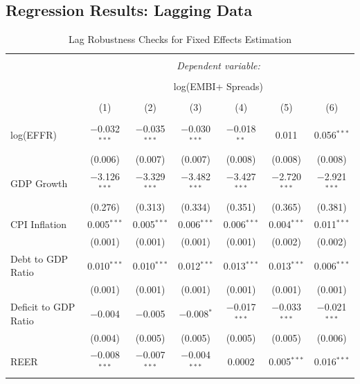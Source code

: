 \documentclass[12pt]{article}
\begin{document}
\subsection{Regression Results: Lagging Data}
\FloatBarrier
\begin{table}[!h] \centering 
  \caption{Lag Robustness Checks for Fixed Effects Estimation} 
  \label{tbl9} 
\scriptsize 
\begin{tabular}{@{\extracolsep{5pt}}lcccccc} 
\\[-1.8ex]\hline 
\hline \\[-1.8ex] 
 & \multicolumn{6}{c}{\textit{Dependent variable:}} \\ 
\cline{2-7} 
\\[-1.8ex] & \multicolumn{6}{c}{log(EMBI+ Spreads)} \\ 
\\[-1.8ex] & (1) & (2) & (3) & (4) & (5) & (6)\\ 
\hline \\[-1.8ex] 
 log(EFFR) & $-$0.032$^{***}$ & $-$0.035$^{***}$ & $-$0.030$^{***}$ & $-$0.018$^{**}$ & 0.011 & 0.056$^{***}$ \\ 
  & (0.006) & (0.007) & (0.007) & (0.008) & (0.008) & (0.008) \\ 
  GDP Growth & $-$3.126$^{***}$ & $-$3.329$^{***}$ & $-$3.482$^{***}$ & $-$3.427$^{***}$ & $-$2.720$^{***}$ & $-$2.921$^{***}$ \\ 
  & (0.276) & (0.313) & (0.334) & (0.351) & (0.365) & (0.381) \\ 
  CPI Inflation & 0.005$^{***}$ & 0.005$^{***}$ & 0.006$^{***}$ & 0.006$^{***}$ & 0.004$^{***}$ & 0.011$^{***}$ \\ 
  & (0.001) & (0.001) & (0.001) & (0.001) & (0.002) & (0.002) \\ 
  Debt to GDP Ratio & 0.010$^{***}$ & 0.010$^{***}$ & 0.012$^{***}$ & 0.013$^{***}$ & 0.013$^{***}$ & 0.006$^{***}$ \\ 
  & (0.001) & (0.001) & (0.001) & (0.001) & (0.001) & (0.001) \\ 
  Deficit to GDP Ratio & $-$0.004 & $-$0.005 & $-$0.008$^{*}$ & $-$0.017$^{***}$ & $-$0.033$^{***}$ & $-$0.021$^{***}$ \\ 
  & (0.004) & (0.005) & (0.005) & (0.005) & (0.005) & (0.006) \\ 
  REER & $-$0.008$^{***}$ & $-$0.007$^{***}$ & $-$0.004$^{***}$ & 0.0002 & 0.005$^{***}$ & 0.016$^{***}$ \\ 

\end{tabular}
\end{table}
\end{document}
